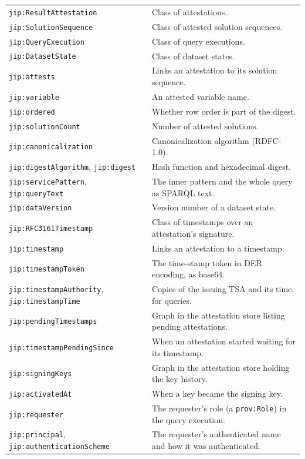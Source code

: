 \documentclass[11pt,a4paper]{article}
\newcommand{\code}[1]{\texttt{#1}}
\begin{document}
\begin{table}[ht]
\begin{tabularx}{\linewidth}{@{}>{\raggedright\arraybackslash}p{44mm}>{\raggedright\arraybackslash}X@{}}
\midrule
\code{jip:ResultAttestation} & Class of attestations. \\
\code{jip:SolutionSequence} & Class of attested solution sequences. \\
\code{jip:QueryExecution} & Class of query executions. \\
\code{jip:DatasetState} & Class of dataset states. \\
\code{jip:attests} & Links an attestation to its solution sequence. \\
\code{jip:variable} & An attested variable name. \\
\code{jip:ordered} & Whether row order is part of the digest. \\
\code{jip:solutionCount} & Number of attested solutions. \\
\code{jip:canonicalization} & Canonicalization algorithm (RDFC-1.0). \\
\code{jip:digestAlgorithm}, \code{jip:digest} & Hash function and hexadecimal digest. \\
\code{jip:servicePattern}, \code{jip:queryText} & The inner pattern and the whole query as
SPARQL text. \\
\code{jip:dataVersion} & Version number of a dataset state. \\
\midrule
\code{jip:RFC3161Timestamp} & Class of timestamps over an attestation's signature. \\
\code{jip:timestamp} & Links an attestation to a timestamp. \\
\code{jip:timestampToken} & The time-stamp token in DER encoding, as base64. \\
\code{jip:timestampAuthority}, \code{jip:timestampTime} & Copies of the issuing TSA and its time,
for queries. \\
\code{jip:pendingTimestamps} & Graph in the attestation store listing pending attestations. \\
\code{jip:timestampPendingSince} & When an attestation started waiting for its timestamp. \\
\code{jip:signingKeys} & Graph in the attestation store holding the key history. \\
\code{jip:activatedAt} & When a key became the signing key. \\
\midrule
\code{jip:requester} & The requester's role (a \code{prov:Role}) in the query execution. \\
\code{jip:principal}, \code{jip:authenticationScheme} & The requester's authenticated name and how
it was authenticated. \\
\bottomrule
\end{tabularx}
\end{table}

\clearpage
\printbibliography[heading=bibintoc]
\end{document}
